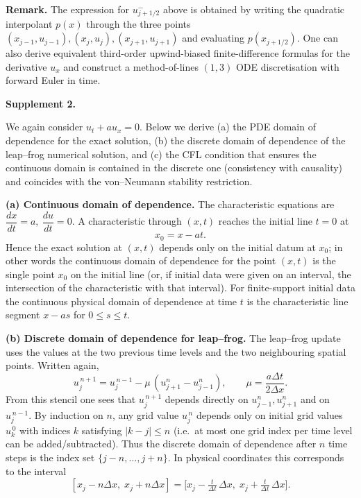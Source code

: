 \documentclass[11pt]{article}
\begin{document}
\medskip

\textbf{Remark.} The expression for \(u_{j+1/2}^-\) above is obtained by writing the quadratic interpolant \(p(x)\) through the three points \((x_{j-1},u_{j-1}), (x_j,u_j),(x_{j+1},u_{j+1})\) and evaluating \(p(x_{j+1/2})\). One can also derive equivalent third-order upwind-biased finite-difference formulas for the derivative \(u_x\) and construct a method-of-lines \((1,3)\) ODE discretisation with forward Euler in time.

\vspace{1em}

\noindent\textbf{Supplement 2.}

We again consider \(u_t + a u_x = 0\). Below we derive (a) the PDE domain of dependence for the exact solution, (b) the discrete domain of dependence of the leap–frog numerical solution, and (c) the CFL condition that ensures the continuous domain is contained in the discrete one (consistency with causality) and coincides with the von–Neumann stability restriction.

\medskip

\textbf{(a) Continuous domain of dependence.}
The characteristic equations are \(\dfrac{dx}{dt}=a,\ \dfrac{du}{dt}=0\). A characteristic through \((x,t)\) reaches the initial line \(t=0\) at
\[
x_0 = x - a t.
\]
Hence the exact solution at \((x,t)\) depends only on the initial datum at \(x_0\); in other words the continuous domain of dependence for the point \((x,t)\) is the single point \(x_0\) on the initial line (or, if initial data were given on an interval, the intersection of the characteristic with that interval). For finite-support initial data the continuous physical domain of dependence at time \(t\) is the characteristic line segment \(x - a s\) for \(0\le s\le t\).

\medskip

\textbf{(b) Discrete domain of dependence for leap–frog.}
The leap–frog update uses the values at the two previous time levels and the two neighbouring spatial points. Written again,
\[
u_j^{\,n+1} = u_j^{\,n-1} - \mu\,(u_{j+1}^n - u_{j-1}^n),\qquad \mu=\frac{a\Delta t}{2\Delta x}.
\]
From this stencil one sees that \(u_j^{\,n+1}\) depends directly on \(u_{j-1}^n,u_{j+1}^n\) and on \(u_j^{\,n-1}\). By induction on \(n\), any grid value \(u_j^{\,n}\) depends only on initial grid values \(u_k^{\,0}\) with indices \(k\) satisfying \(|k-j|\le n\) (i.e.\ at most one grid index per time level can be added/subtracted). Thus the discrete domain of dependence after \(n\) time steps is the index set \(\{j-n,\dots,j+n\}\). In physical coordinates this corresponds to the interval
\[
[x_j - n\Delta x,\; x_j + n\Delta x] = \big[x_j - \tfrac{t}{\Delta t}\,\Delta x,\; x_j + \tfrac{t}{\Delta t}\,\Delta x\big].
\]
\end{document}
